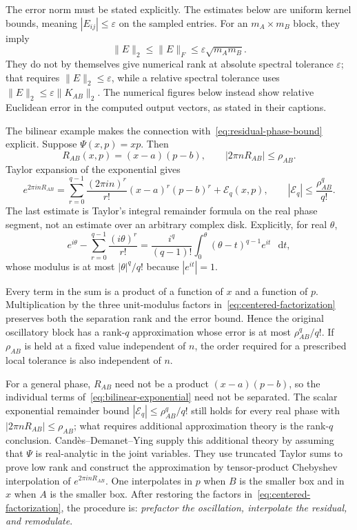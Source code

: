 \documentclass[11pt,a4paper]{article}
\newcommand{\dd}{\mathop{}\!\mathrm{d}}
\begin{document}
The error norm must be stated explicitly. The estimates below are uniform kernel bounds, meaning $|E_{ij}|\leq\varepsilon$ on the sampled entries. For an $m_A\times m_B$ block, they imply
\begin{equation}
    \|E\|_2\leq\|E\|_F\leq\varepsilon\sqrt{m_Am_B}.
\end{equation}
They do not by themselves give numerical rank at absolute spectral tolerance $\varepsilon$; that requires $\|E\|_2\leq\varepsilon$, while a relative spectral tolerance uses $\|E\|_2\leq\varepsilon\|K_{AB}\|_2$. The numerical figures below instead show relative Euclidean error in the computed output vectors, as stated in their captions.

The bilinear example makes the connection with~\eqref{eq:residual-phase-bound} explicit. Suppose $\Psi(x,p)=xp$. Then
\begin{equation}
    R_{AB}(x,p)=(x-a)(p-b),
    \qquad
    |2\pi nR_{AB}|\leq\rho_{AB}.
\end{equation}
Taylor expansion of the exponential gives
\begin{equation}
    e^{2\pi i nR_{AB}}
    =\sum_{r=0}^{q-1}
     \frac{(2\pi i n)^r}{r!}(x-a)^r(p-b)^r
     +\mathcal{E}_q(x,p),
    \qquad
    |\mathcal{E}_q|\leq\frac{\rho_{AB}^q}{q!}.
    \label{eq:bilinear-exponential}
\end{equation}
The last estimate is Taylor's integral remainder formula on the real phase segment, not an estimate over an arbitrary complex disk. Explicitly, for real $\theta$,
\[
 e^{i\theta}-\sum_{r=0}^{q-1}\frac{(i\theta)^r}{r!}
 =\frac{i^q}{(q-1)!}\int_0^\theta(\theta-t)^{q-1}e^{it}\,\dd t,
\]
whose modulus is at most $|\theta|^q/q!$ because $|e^{it}|=1$.

Every term in the sum is a product of a function of $x$ and a function of $p$. Multiplication by the three unit-modulus factors in~\eqref{eq:centered-factorization} preserves both the separation rank and the error bound. Hence the original oscillatory block has a rank-$q$ approximation whose error is at most $\rho_{AB}^q/q!$. If $\rho_{AB}$ is held at a fixed value independent of $n$, the order required for a prescribed local tolerance is also independent of $n$.

For a general phase, $R_{AB}$ need not be a product $(x-a)(p-b)$, so the individual terms of~\eqref{eq:bilinear-exponential} need not be separated. The scalar exponential remainder bound $|\mathcal E_q|\leq \rho_{AB}^q/q!$ still holds for every real phase with $|2\pi nR_{AB}|\leq \rho_{AB}$; what requires additional approximation theory is the rank-$q$ conclusion. Cand\`{e}s--Demanet--Ying supply this additional theory by assuming that $\Psi$ is real-analytic in the joint variables. They use truncated Taylor sums to prove low rank and construct the approximation by tensor-product Chebyshev interpolation of $e^{2\pi i nR_{AB}}$. One interpolates in $p$ when $B$ is the smaller box and in $x$ when $A$ is the smaller box. After restoring the factors in~\eqref{eq:centered-factorization}, the procedure is: \emph{prefactor the oscillation, interpolate the residual, and remodulate}.
\end{document}
